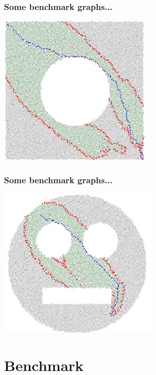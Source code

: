 \documentclass{beamer}
\begin{document}
\begin{frame}
\frametitle{Some benchmark graphs...}
\begin{center}
	\includegraphics[height=210pt]{circle.png}
\end{center}
\end{frame}

\begin{frame}
\frametitle{Some benchmark graphs...}
\begin{center}
	\includegraphics[height=210pt]{smiley.png}
\end{center}
\end{frame}

\section{Benchmark}
\end{document}

